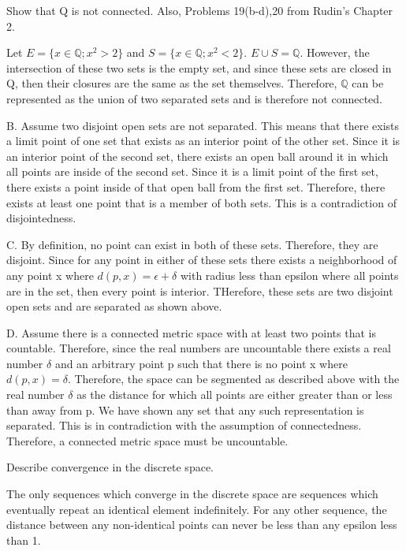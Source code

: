 \documentclass[12pt]{article}
\newenvironment{exercise}[2][Exercise]{\begin{trivlist}
\item[\hskip \labelsep {\bfseries #1}\hskip \labelsep {\bfseries #2.}]}{\end{trivlist}}
\begin{document}
\begin{exercise}{2.4}                                                                                      Show that Q is not connected. Also, Problems 19(b-d),20 from Rudin's Chapter 2.                            \end{exercise}
Let $E = \{x \in \mathbb{Q}; x^2 > 2\}$ and $S = \{x \in \mathbb{Q}; x^2 < 2\}$. $E \cup S = \mathbb{Q}$. However, the intersection of these two sets is the empty set, and since these sets are closed in Q, then their closures are the same as the set themselves. Therefore, $\mathbb{Q}$ can be represented as the union of two separated sets and is therefore not connected.

B. Assume two disjoint open sets are not separated. This means that there exists a limit point of one set that exists as an interior point of the other set. Since it is an interior point of the second set, there exists an open ball around it in which all points are inside of the second set. Since it is a limit point of the first set, there exists a point inside of that open ball from the first set. Therefore, there exists at least one point that is a member of both sets. This is a contradiction of disjointedness.

C. By definition, no point can exist in both of these sets. Therefore, they are disjoint. Since for any point in either of these sets there exists a neighborhood of any point x where $d(p, x) = \epsilon + \delta$ with radius less than epsilon where all points are in the set, then every point is interior. THerefore, these sets are two disjoint open sets and are separated as shown above.

D. Assume there is a connected metric space with at least two points that is countable. Therefore, since the real numbers are uncountable there exists a real number $\delta$ and an arbitrary point p such that there is no point x where $d(p, x) = \delta$. Therefore, the space can be segmented as described above with the real number $\delta$ as the distance for which all points are either greater than or less than away from p. We have shown any set that any such representation is separated. This is in contradiction with the assumption of connectedness. Therefore, a connected metric space must be uncountable.
\begin{exercise}{2.5}                                                                                      Describe convergence in the discrete space.                                                                \end{exercise}                                                                                        
The only sequences which converge in the discrete space are sequences which eventually repeat an identical element indefinitely. For any other sequence, the distance between any non-identical points can never be less than any epsilon less than 1.
\end{document}
